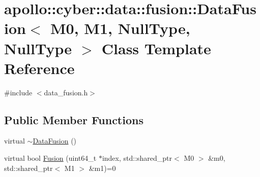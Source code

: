 \hypertarget{classapollo_1_1cyber_1_1data_1_1fusion_1_1DataFusion_3_01M0_00_01M1_00_01NullType_00_01NullType_01_4}{\section{apollo\-:\-:cyber\-:\-:data\-:\-:fusion\-:\-:Data\-Fusion$<$ M0, M1, Null\-Type, Null\-Type $>$ Class Template Reference}
\label{classapollo_1_1cyber_1_1data_1_1fusion_1_1DataFusion_3_01M0_00_01M1_00_01NullType_00_01NullType_01_4}
}


{\ttfamily \#include $<$data\-\_\-fusion.\-h$>$}

\subsection*{Public Member Functions}
\begin{DoxyCompactItemize}
\item 
virtual \hyperlink{classapollo_1_1cyber_1_1data_1_1fusion_1_1DataFusion_3_01M0_00_01M1_00_01NullType_00_01NullType_01_4_a00ddb3bdc41bb1bc565b19855a0144c4}{$\sim$\-Data\-Fusion} ()
\item 
virtual bool \hyperlink{classapollo_1_1cyber_1_1data_1_1fusion_1_1DataFusion_3_01M0_00_01M1_00_01NullType_00_01NullType_01_4_a6b9cf51903537b06774714ba4279aadb}{Fusion} (uint64\-\_\-t $\ast$index, std\-::shared\-\_\-ptr$<$ M0 $>$ \&m0, std\-::shared\-\_\-ptr$<$ M1 $>$ \&m1)=0
\end{DoxyCompactItemize}


